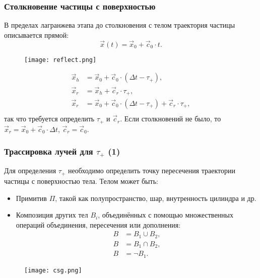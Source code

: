 \documentclass[onlymath]{beamer}
\newcommand{\ts}{\Delta t}
\begin{document}
\begin{frame}
  \frametitle{Столкновение частицы с поверхностью}
  В пределах лагранжева этапа до столкновения с телом траектория частицы
  описывается прямой:
  \begin{equation*}
    \vec{x}(t) = \vec{x}_0 + \vec{c}_0 \cdot t.
  \end{equation*}
  \begin{figure}[!h]
    \centering
    \texttt{[image: reflect.png]}
  \end{figure}
  \begin{equation}
    \label{eq:hit-taus}
    \begin{aligned}
      \vec{x}_h &= \vec{x}_0 + \vec{c}_0 \cdot (\ts - \tau_+),\\
      \vec{x}_r &= \vec{x}_h + \vec{c}_r \cdot \tau_+,\\
      \vec{x}_r &= \vec{x}_0 + \vec{c}_0 \cdot (\ts - \tau_+) + \vec{c}_r \cdot \tau_+,\\
    \end{aligned}
  \end{equation}
  так что требуется определить $\tau_+$ и $\vec{c}_r$. Если
  столкновений не было, то $\vec{x}_r = \vec{x}_0 + \vec{c}_0 \cdot
  \ts$, $\vec{c}_r = \vec{c}_0$.
\end{frame}

\begin{frame}
  \frametitle{Трассировка лучей для $\tau_+$ (1)}
  Для определения $\tau_+$ необходимо определить точку пересечения
  траектории частицы с поверхностью тела. Телом может быть:
  \begin{itemize}
  \item Примитив $\Pi$, такой как полупространство, шар, внутренность
    цилиндра и др.
  \item Композиция других тел $B_i$, объединённых с помощью множественных
    операций объединения, пересечения или дополнения:
    \begin{equation*}
      \begin{aligned}
        B &= B_1 \cup B_2,\\
        B &= B_1 \cap B_2,\\
        B &= \neg B_1.
      \end{aligned}
    \end{equation*}
  \end{itemize}
  \begin{figure}[!h]
    \centering
    \texttt{[image: csg.png]}
  \end{figure}
\end{frame}
\end{document}
